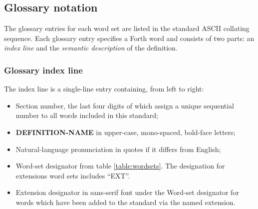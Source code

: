 \subsection{Glossary notation}
\label{notation:glossary}

The glossary entries for each word set are listed in the standard
ASCII collating sequence. Each glossary entry specifies a Forth
word and consists of two parts:
an \emph{index line} and the \emph{semantic description} of the
definition.

\pagebreak
\subsubsection{Glossary index line}

The index line is a single-line entry containing, from left to right:

\begin{itemize}
\item Section number, the last four digits of which assign a
	unique sequential number to all words included in this standard;

\item \textbf{DEFINITION-NAME} in upper-case, mono-spaced,
	bold-face letters;

\item Natural-language pronunciation in quotes if it differs from English;

\item Word-set designator from table \ref{table:wordsets}.
	The designation for extensions word sets includes ``EXT''.

\item \textsf{Extension designator} in sans-serif font under the
	Word-set designator for words which have been added to the
	standard via the named extension.
\end{itemize}

